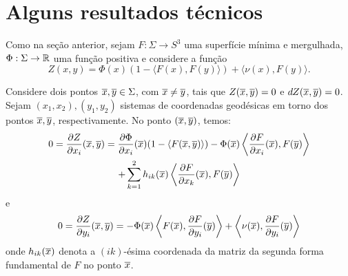 \section{Alguns resultados técnicos}

Como na seção anterior, sejam $F: \Sigma \rightarrow S^3$ uma superfície mínima e mergulhada, $\Phi: \Sigma \rightarrow \mathbb{R}$ uma função positiva e considere a função
\begin{equation*}
	Z(x,y) = \Phi(x) (1 - \langle F(x), F(y) \rangle) + \langle \nu(x), F(y) \rangle.
\end{equation*}

Considere dois pontos $\overline{x}, \overline{y} \in \Sigma$, com $\overline{x} \neq \overline{y}$, tais que $Z(\overline{x}, \overline{y}) = 0$ e $dZ(\overline{x}, \overline{y}) = 0$. Sejam $(x_1,x_2), (y_1,y_2)$ sistemas de coordenadas geodésicas em torno dos pontos $\overline{x}, \overline{y}$, respectivamente. No ponto $(\overline{x},\overline{y})$, temos:
\begin{multline}\label{diff_Z_x}
0 = \frac{\partial Z}{\partial x_i} (\overline{x}, \overline{y}) =  \frac{\partial \Phi}{\partial x_i}(\overline{x}) (1 - \langle F(\overline{x}, \overline{y}) \rangle) -  \Phi(\overline{x}) \left\langle \frac{\partial F}{\partial x_i}(\overline{x}), F(\overline{y}) \right\rangle\\
+ \sum_{k=1}^{2} h_{ik}(\overline{x}) \left\langle \frac{\partial F}{\partial x_k}(\overline{x}), F(\overline{y}) \right\rangle
\end{multline}
e
\begin{equation}\label{diff_Z_y}
0 = \frac{\partial Z}{\partial y_i} (\overline{x}, \overline{y}) = - \Phi(\overline{x}) \left\langle F(\overline{x}), \frac{\partial F}{\partial y_i} (\overline{y}) \right\rangle + \left\langle \nu(\overline{x}), \frac{\partial F}{\partial y_i}(\overline{y}) \right\rangle
\end{equation}
onde $h_{ik}(\overline{x})$ denota a $(ik)$-ésima coordenada da matriz da segunda forma fundamental de $F$ no ponto $\overline{x}$.




